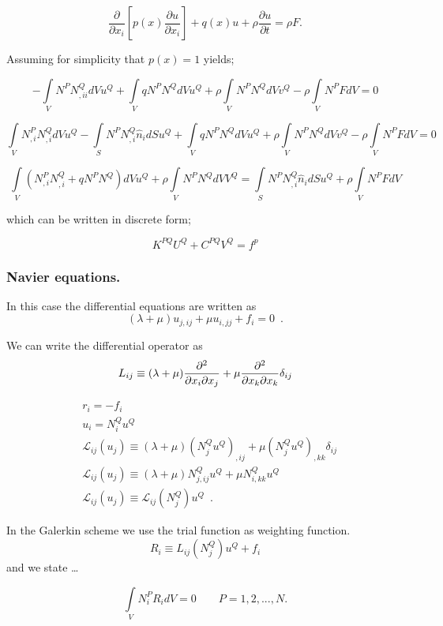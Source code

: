 \[\frac{\partial }{{\partial {x_i}}}\left[ {p(x)\frac{{\partial u}}{{\partial {x_i}}}} \right] + q(x)u + \rho \frac{{\partial u}}{{\partial t}} = \rho F.\]

Assuming for simplicity that $p(x)=1$ yields;

\[ - \int\limits_V {{N^P}N_{,ii}^Q} dV{u^Q} + \int\limits_V {q{N^P}{N^Q}dV{u^Q}}  + \rho \int\limits_V {{N^P}{N^Q}dV{v^Q}}  - \rho \int\limits_V {{N^P}FdV = 0} \]

\[\int\limits_V {N_{,i}^PN_{,i}^Q} dV{u^Q} - \int\limits_S {{N^P}N_{,i}^Q{{\hat n}_i}} dS{u^Q} + \int\limits_V {q{N^P}{N^Q}dV{u^Q}}  + \rho \int\limits_V {{N^P}{N^Q}dV{v^Q}}  - \rho \int\limits_V {{N^P}FdV = 0} \]

\[\int\limits_V {\left( {N_{,i}^PN_{,i}^Q + q{N^P}{N^Q}} \right)dV{u^Q}}  + \rho \int\limits_V {{N^P}{N^Q}dV{V^Q}}  = \int\limits_S {{N^P}N_{,i}^Q{{\hat n}_i}} dS{u^Q} + \rho \int\limits_V {{N^P}FdV} \]

which can be written in discrete form;

\[{K^{PQ}}{U^Q} + {C^{PQ}}{V^Q} = {f^p}\]



\subsubsection*{Navier equations.}
In this case the differential equations are written as
\[(\lambda  + \mu ){u_{j,ij}} + \mu {u_{i,jj}} + {f_i} = 0 \enspace .\]

We can write the differential operator as
\[L_{ij} \equiv (\lambda  + \mu )\pdv[2]{}{x_i}{x_j} + \mu \pdv[2]{}{x_k}{x_k}\delta_{ij}\]

\begin{align*}
&r_i =  - f_i\\
&u_i = N_i^Q u^Q\\
&\mathcal{L}_{ij}(u_j) \equiv (\lambda  + \mu )(N_j^Q{u^Q})_{,ij} + \mu (N_j^Q{u^Q})_{,kk}\delta_{ij}\\
&\mathcal{L}_{ij}(u_j) \equiv (\lambda  + \mu )N_{j,ij}^Q u^Q + \mu N_{i,kk}^Q u^Q\\
&\mathcal{L}_{ij}(u_j) \equiv \mathcal{L}_{ij}(N_j^Q) u^Q \enspace .
\end{align*}

In the Galerkin scheme we use the trial function as weighting function.
\[R_i \equiv L_{ij}(N_j^Q) u^Q + f_i\]
and we state \dots

\[\int\limits_V {N_i^P{R_i}dV = 0} \quad \quad P=1,2,...,N. \]

